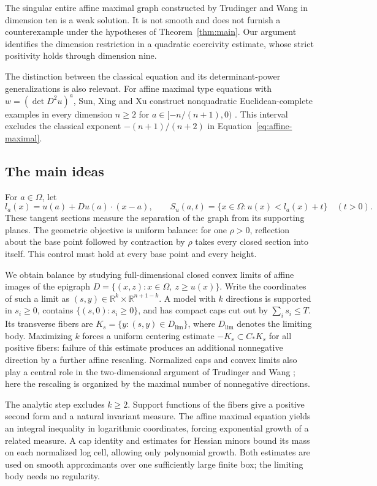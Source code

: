 \documentclass[11pt]{amsart}
\newcommand{\R}{\mathbb R}
\theoremstyle{definition}
\theoremstyle{remark}
\numberwithin{equation}{section}
\begin{document}
The singular entire affine maximal graph constructed by Trudinger and
Wang in dimension ten \cite[Section~7]{TW2000} is a weak solution.
It is not smooth and does not furnish a counterexample under the
hypotheses of Theorem~\ref{thm:main}. Our argument identifies the
dimension restriction in a quadratic coercivity estimate, whose strict
positivity holds through dimension nine.

The distinction between the classical equation and its determinant-power
generalizations is also relevant. For affine maximal type equations
with \(w=(\det D^2u)^a\), Sun, Xing and Xu construct nonquadratic
Euclidean-complete examples in every dimension \(n\ge2\) for
\(a\in[-n/(n+1),0)\) \cite[Theorem~1.3]{SunXingXu2026}.
This interval excludes the classical exponent \(-(n+1)/(n+2)\)
in Equation~\eqref{eq:affine-maximal}.

\subsection*{The main ideas}
For \(a\in\Omega\), let
\[
 l_a(x)=u(a)+Du(a)\cdot(x-a),\qquad
 S_u(a,t)=\{x\in\Omega:u(x)<l_a(x)+t\}\quad(t>0).
\]
These tangent sections measure the separation of the graph from its
supporting planes. The geometric objective is uniform balance: for one
\(\rho>0\), reflection about the base point followed by contraction by
\(\rho\) takes every closed section into itself. This control must hold
at every base point and every height.

We obtain balance by studying full-dimensional closed convex limits of
affine images of the epigraph \(D=\{(x,z):x\in\Omega,\ z\ge u(x)\}\).
Write the coordinates of such a limit as
\((s,y)\in\R^k\times\R^{n+1-k}\). A model with \(k\) directions is
supported in \(s_i\ge0\), contains \(\{(s,0):s_i\ge0\}\), and has
compact caps cut out by \(\sum_i s_i\le T\). Its transverse fibers are
\(K_s=\{y:(s,y)\in D_{\mathrm{lim}}\}\), where \(D_{\mathrm{lim}}\)
denotes the limiting body. Maximizing \(k\) forces a uniform centering
estimate \(-K_s\subset C_*K_s\) for all positive fibers: failure of
this estimate produces an additional nonnegative direction by a further
affine rescaling. Normalized caps and convex limits also play a central
role in the two-dimensional argument of Trudinger and Wang
\cite[Section~5]{TW2000}; here the rescaling is organized by the maximal
number of nonnegative directions.

The analytic step excludes \(k\ge2\). Support functions of the fibers
give a positive second form and a natural invariant measure. The
affine maximal equation yields an integral inequality in logarithmic
coordinates, forcing exponential growth of a related measure.
A cap identity and estimates for Hessian minors bound its mass on
each normalized log cell, allowing only polynomial growth.
Both estimates are used on smooth approximants over one sufficiently
large finite box; the limiting body needs no regularity.
\end{document}
